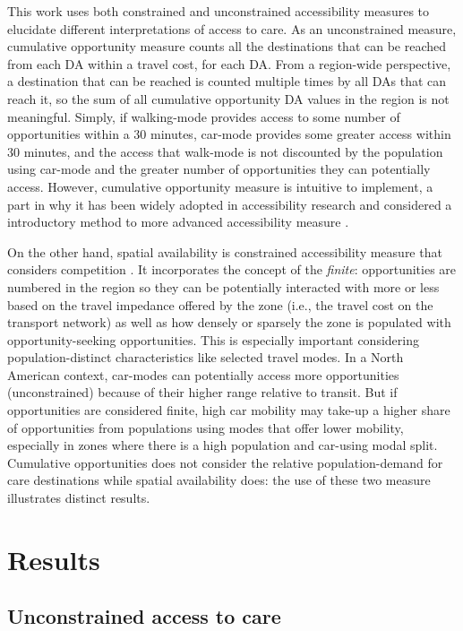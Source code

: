 \documentclass[
  authoryear,
  preprint,
  3p]{elsarticle}
\begin{document}
This work uses both constrained and unconstrained accessibility measures
to elucidate different interpretations of access to care. As an
unconstrained measure, cumulative opportunity measure counts all the
destinations that can be reached from each DA within a travel cost, for
each DA. From a region-wide perspective, a destination that can be
reached is counted multiple times by all DAs that can reach it, so the
sum of all cumulative opportunity DA values in the region is not
meaningful. Simply, if walking-mode provides access to some number of
opportunities within a 30 minutes, car-mode provides some greater access
within 30 minutes, and the access that walk-mode is not discounted by
the population using car-mode and the greater number of opportunities
they can potentially access. However, cumulative opportunity measure is
intuitive to implement, a part in why it has been widely adopted in
accessibility research and considered a introductory method to more
advanced accessibility measure
\citep{elgeneidyMakingAccessibilityWork2021}.

On the other hand, spatial availability is constrained accessibility
measure that considers competition
\citep{soukhovIntroducingSpatialAvailability2023}. It incorporates the
concept of the \emph{finite}: opportunities are numbered in the region
so they can be potentially interacted with more or less based on the
travel impedance offered by the zone (i.e., the travel cost on the
transport network) as well as how densely or sparsely the zone is
populated with opportunity-seeking opportunities. This is especially
important considering population-distinct characteristics like selected
travel modes. In a North American context, car-modes can potentially
access more opportunities (unconstrained) because of their higher range
relative to transit. But if opportunities are considered finite, high
car mobility may take-up a higher share of opportunities from
populations using modes that offer lower mobility, especially in zones
where there is a high population and car-using modal split. Cumulative
opportunities does not consider the relative population-demand for care
destinations while spatial availability does: the use of these two
measure illustrates distinct results.

\hypertarget{results}{%
\section{Results}\label{results}}

\hypertarget{unconstrained-access-to-care}{%
\subsection{Unconstrained access to
care}\label{unconstrained-access-to-care}}
\end{document}
